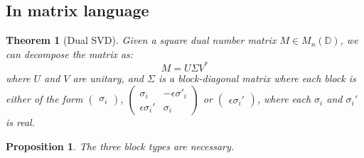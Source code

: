 \documentclass[
]{article}
\theoremstyle{theorem}
\newtheorem*{theorem}{Theorem}
\theoremstyle{proposition}
\newtheorem{proposition}{Proposition}
\begin{document}
\subsection{In matrix language}

\begin{theorem}[Dual SVD]
Given a square dual number matrix \(M \in M_n(\mathbb D)\), we can decompose the matrix as: \[M = U\Sigma V^*\] where \(U\) and \(V\) are unitary, and \(\Sigma\) is a block-diagonal matrix where each block is either of the form \(\begin{pmatrix}\sigma_i\end{pmatrix}\), \(\begin{pmatrix}\sigma_i & -\epsilon \sigma'_i \\ \epsilon\sigma_i' & \sigma_i\end{pmatrix}\) or \(\begin{pmatrix} \epsilon\sigma_i'\end{pmatrix}\),
where each \(\sigma_i\) and \(\sigma_i'\) is real.
\end{theorem}

\begin{proposition}
  The three block types are necessary.
\end{proposition}
\end{document}
